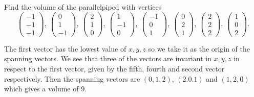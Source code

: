 \documentclass[letter-paper]{tufte-book}
\newenvironment{example}[1][Example]{\begin{trivlist}
\item[\hskip \labelsep {\bfseries #1}]}{\end{trivlist}}
\begin{document}
\begin{example}
	Find the volume of the parallelpiped with vertices
	\begin{equation*}
		\begin{pmatrix}-1\\-1\\-1\end{pmatrix},\
		\begin{pmatrix}0\\1\\-1\end{pmatrix},\
		\begin{pmatrix}2\\1\\0\end{pmatrix},\
		\begin{pmatrix}1\\-1\\0\end{pmatrix},\
		\begin{pmatrix}-1\\0\\1\end{pmatrix},\
		\begin{pmatrix}0\\2\\1\end{pmatrix},\
		\begin{pmatrix}2\\2\\2\end{pmatrix},\
		\begin{pmatrix}1\\0\\2\end{pmatrix}.
	\end{equation*}
	
	The first vector has the lowest value of $x,y,z$ so we take it as the origin
	of the spanning vectors. We see that three of the vectors are invariant in
	$x,y,z$ in respect to the first vector, given by the fifth, fourth and
	second vector respectively. Then the spanning vectors are $(0,1,2)$,
	$(2.0.1)$ and $(1,2,0)$ which gives a volume of $9$.
\end{example}
\end{document}
